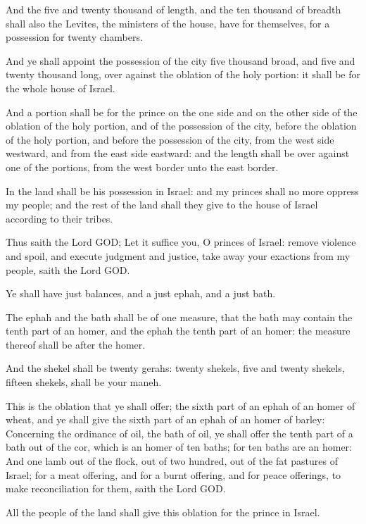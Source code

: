 \verse And the five and twenty thousand of length, and the ten thousand of breadth shall also the Levites, the ministers of the house, have for themselves, for a possession for twenty chambers.

\verse And ye shall appoint the possession of the city five thousand broad, and five and twenty thousand long, over against the oblation of the holy portion: it shall be for the whole house of Israel.

\verse And a portion shall be for the prince on the one side and on the other side of the oblation of the holy portion, and of the possession of the city, before the oblation of the holy portion, and before the possession of the city, from the west side westward, and from the east side eastward: and the length shall be over against one of the portions, from the west border unto the east border.

\verse In the land shall be his possession in Israel: and my princes shall no more oppress my people; and the rest of the land shall they give to the house of Israel according to their tribes.

\verse Thus saith the Lord GOD; Let it suffice you, O princes of Israel: remove violence and spoil, and execute judgment and justice, take away your exactions from my people, saith the Lord GOD.

\verse Ye shall have just balances, and a just ephah, and a just bath.

\verse The ephah and the bath shall be of one measure, that the bath may contain the tenth part of an homer, and the ephah the tenth part of an homer: the measure thereof shall be after the homer.

\verse And the shekel shall be twenty gerahs: twenty shekels, five and twenty shekels, fifteen shekels, shall be your maneh.

\verse This is the oblation that ye shall offer; the sixth part of an ephah of an homer of wheat, and ye shall give the sixth part of an ephah of an homer of barley: \verse Concerning the ordinance of oil, the bath of oil, ye shall offer the tenth part of a bath out of the cor, which is an homer of ten baths; for ten baths are an homer: \verse And one lamb out of the flock, out of two hundred, out of the fat pastures of Israel; for a meat offering, and for a burnt offering, and for peace offerings, to make reconciliation for them, saith the Lord GOD.

\verse All the people of the land shall give this oblation for the prince in Israel.

